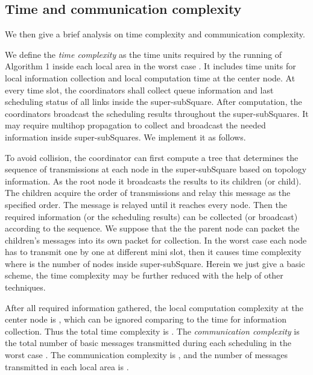 \documentclass[journal]{IEEEtran}
\begin{document}
\subsection{Time and communication complexity}
We then give a brief analysis on time complexity and communication complexity.

 We define the \emph{time complexity} as the time units required by the running of Algorithm 1 inside each local area in the worst case \cite{peleg87}. It includes time units for local information collection and local computation time at the center node.
  At every time slot, the coordinators shall collect queue information and last scheduling status of all links inside the super-subSquare. After computation, the coordinators broadcast the scheduling results throughout the super-subSquares.
  It may require multihop propagation to collect and broadcast the needed information inside super-subSquares.  We implement it as follows.

   To avoid collision, the coordinator can first compute a tree that determines the sequence of transmissions at each node in the super-subSquare based on topology information. As the root node it broadcasts the results to its children (or child). The children acquire the order of transmissions and relay this message as the specified order. The message is relayed until it reaches every node.
      Then the required information (or the scheduling results) can be collected (or broadcast) according to the sequence. We suppose that the the parent node can packet the children's messages into its own packet for collection.
      In the worst case each node has to transmit one by one at different mini slot, then it causes  time complexity where  is the number of nodes inside super-subSquare. Herein we just give a basic scheme, the time complexity may be further reduced with the help of other techniques.

   After all required information gathered, the local computation complexity at the center node is , which can be ignored comparing to the time for information collection. Thus the total time complexity is .
 The \emph{ communication complexity} is the total number of basic messages transmitted during each scheduling in the worst case \cite{peleg87}. The communication complexity is , and the number of messages transmitted in each local area is .
\end{document}
